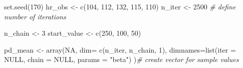 \documentclass[
  12pt,
]{book}
\newenvironment{Shaded}{\begin{snugshade}}{\end{snugshade}}
\newcommand{\AttributeTok}[1]{\textcolor[rgb]{0.77,0.63,0.00}{#1}}
\newcommand{\CommentTok}[1]{\textcolor[rgb]{0.56,0.35,0.01}{\textit{#1}}}
\newcommand{\ConstantTok}[1]{\textcolor[rgb]{0.00,0.00,0.00}{#1}}
\newcommand{\DecValTok}[1]{\textcolor[rgb]{0.00,0.00,0.81}{#1}}
\newcommand{\FunctionTok}[1]{\textcolor[rgb]{0.00,0.00,0.00}{#1}}
\newcommand{\NormalTok}[1]{#1}
\newcommand{\OtherTok}[1]{\textcolor[rgb]{0.56,0.35,0.01}{#1}}
\newcommand{\StringTok}[1]{\textcolor[rgb]{0.31,0.60,0.02}{#1}}
\begin{document}
\begin{Shaded}
\begin{Highlighting}[]
\FunctionTok{set.seed}\NormalTok{(}\DecValTok{170}\NormalTok{)}
\NormalTok{hr\_obs }\OtherTok{\textless{}{-}} \FunctionTok{c}\NormalTok{(}\DecValTok{104}\NormalTok{, }\DecValTok{112}\NormalTok{, }\DecValTok{132}\NormalTok{, }\DecValTok{115}\NormalTok{, }\DecValTok{110}\NormalTok{)}
\NormalTok{n\_iter }\OtherTok{\textless{}{-}} \DecValTok{2500} \CommentTok{\# define number of iterations}

\NormalTok{n\_chain }\OtherTok{\textless{}{-}} \DecValTok{3}
\NormalTok{start\_value }\OtherTok{\textless{}{-}} \FunctionTok{c}\NormalTok{(}\DecValTok{250}\NormalTok{, }\DecValTok{100}\NormalTok{, }\DecValTok{50}\NormalTok{)}

\NormalTok{pd\_mean }\OtherTok{\textless{}{-}} \FunctionTok{array}\NormalTok{(}\ConstantTok{NA}\NormalTok{, }\AttributeTok{dim=} \FunctionTok{c}\NormalTok{(n\_iter, n\_chain, }\DecValTok{1}\NormalTok{), }\AttributeTok{dimnames=}\FunctionTok{list}\NormalTok{(}\AttributeTok{iter =} \ConstantTok{NULL}\NormalTok{, }\AttributeTok{chain =} \ConstantTok{NULL}\NormalTok{, }\AttributeTok{params =} \StringTok{"beta"}\NormalTok{) )}\CommentTok{\# create vector for sample values}


\end{Highlighting}
\end{Shaded}
\end{document}
